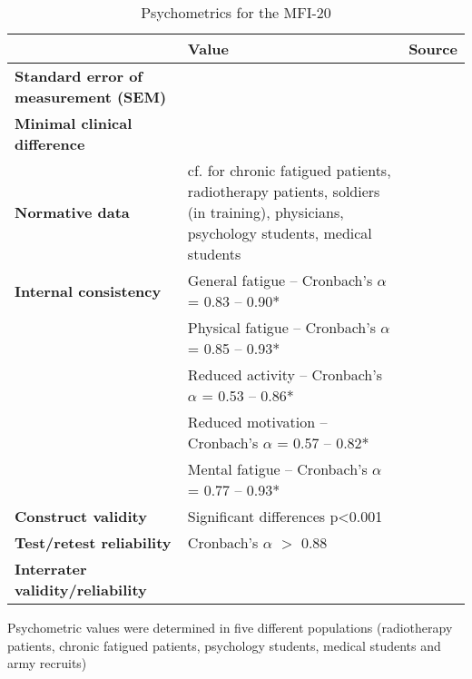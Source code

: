 \begin{table}[H]
\begin{tabularx}{1\textwidth}[H]{| >{\raggedright\arraybackslash}X | >{\raggedright\arraybackslash}X | >{\raggedright\arraybackslash}X | }
\caption{Psychometrics for the \acl{MFI-20}}\\ \hline
                                             & Value                                                               & Source                \\ \hline
\textbf{Standard error of measurement (SEM)} &                                                                     &                       \\ \hline
\textbf{Minimal clinical difference}         &                                                                     &                       \\ \hline
\textbf{Normative data}                      & cf. \cite{smets1995mfi20} for chronic fatigued patients,
                                               radiotherapy patients, soldiers (in training), physicians,
                                               psychology students, medical students                               & \cite{smets1995mfi20} \\ \hline
\textbf{Internal consistency}                & General fatigue -- Cronbach's $\alpha$ = \num{.83} -- \num{.90}*    & \cite{smets1995mfi20} \\
                                             & Physical fatigue -- Cronbach's $\alpha$ = \num{.85} -- \num{.93}*   & \cite{smets1995mfi20} \\
                                             & Reduced activity -- Cronbach's $\alpha$ = \num{.53} -- \num{.86}*   & \cite{smets1995mfi20} \\
                                             & Reduced motivation -- Cronbach's $\alpha$ = \num{.57} -- \num{.82}* & \cite{smets1995mfi20} \\
                                             & Mental fatigue -- Cronbach's $\alpha$ = \num{.77} -- \num{.93}*     & \cite{smets1995mfi20} \\ \hline
\textbf{Construct validity}                  & Significant differences p<\num{0.001}                               & \cite{smets1995mfi20} \\ \hline
\textbf{Test/retest reliability}             & Cronbach's $\alpha$ $>$ \num{.88}                                   & \cite{hinz2020mfi20}  \\ \hline
\textbf{Interrater validity/reliability}     &                                                                     &                       \\ \hline
\end{tabularx}

\bigskip
\footnotesize{
Psychometric values were determined in five different populations
(radiotherapy patients, chronic fatigued patients, psychology
students, medical students and army recruits)
}
\end{table}
